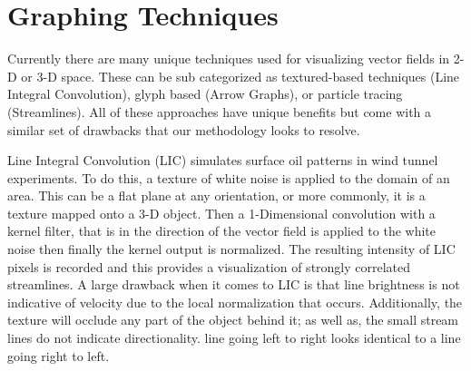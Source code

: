\section{Graphing Techniques}

Currently there are many unique techniques used for visualizing vector fields in 2-D or 3-D space. These can be sub categorized as textured-based techniques (Line Integral Convolution), glyph based (Arrow Graphs), or particle tracing (Streamlines). All of these approaches have unique benefits but come with a similar set of drawbacks that our methodology looks to resolve. \par

Line Integral Convolution (LIC) simulates surface oil patterns in wind tunnel experiments. To do this, a texture of white noise is applied to the domain of an area. This can be a flat plane at any orientation, or more commonly, it is a texture mapped onto a 3-D object. Then a 1-Dimensional convolution with a kernel filter, that is in the direction of the vector field is applied to the white noise then finally the kernel output is normalized.\cite{Cabral1993} The resulting intensity of LIC pixels is recorded and this provides a visualization of strongly correlated streamlines. A large drawback when it comes to LIC is that line brightness is not indicative of velocity due to the local normalization that occurs.  Additionally, the texture will occlude any part of the object behind it; as well as, the small stream lines do not indicate directionality.  line going left to right looks identical to a line going right to left. \cite{LIC}\par

